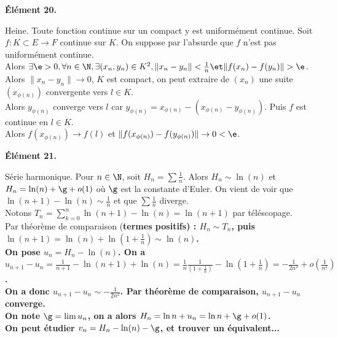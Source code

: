 \documentclass[11pt]{article}
\begin{document}
\begin{center}
    \bf{Élément 20.}
\end{center}

\begin{thm}{Heine.}{}
    Toute fonction continue sur un compact y est uniformément continue.
    \tcblower
    Soit $f:K\subset E\to F$ continue sur $K$. On suppose par l'absurde que $f$ n'est pas uniformément continue.\\
    Alors $\exists \e > 0, \forall n \in \N, \exists(x_n,y_n)\in K^2, \|x_n-y_n\|<\frac{1}{n} \et \|f(x_n)-f(y_n)\|>\e$.\\
    Alors $\|x_n-y_n\|\to0$, $K$ est compact, on peut extraire de $(x_n)$ une suite $(x_{\phi(n)})$ convergente vers $l\in K$.\\
    Alors $y_{\phi(n)}$ converge vers $l$ car $y_{\phi(n)}=x_{\phi(n)}-(x_{\phi(n)}-y_{\phi(n)})$. Puis $f$ est continue en $l\in K$.\\
    Alors $f(x_{\phi(n)})\to f(l)$ et $\|f(x_{\phi(n)}) - f(y_{\phi(n)})\| \to 0 < \e$.
\end{thm}

\begin{center}
    \bf{Élément 21.}
\end{center}

\begin{prop}{Série harmonique.}{}
    Pour $n\in\N$, soit $H_n=\sum \frac{1}{n}$. Alors $H_n\sim\ln(n)$ et $H_n=\ln(n)+\g+o(1)$ où $\g$ est la constante d'Euler.
    \tcblower
    On vient de voir que $\ln(n+1)-\ln(n)\sim\frac{1}{n}$ et que $\sum\frac{1}{n}$ diverge.\\
    Notons $T_n=\sum_{k=0}^n\ln(n+1)-\ln(n)=\ln(n+1)$ par téléscopage.\\
    Par théorème de comparaison (\bf{termes positifs}) : $H_n\sim T_n$, puis $\ln(n+1)=\ln(n)+\ln(1+\frac{1}{n})\sim \ln(n)$.\\
    On pose $u_n=H_n-\ln(n)$. On a $u_{n+1}-u_n = \frac{1}{n+1}-\ln(n+1)+\ln(n)=\frac{1}{n}\frac{1}{(1+\frac{1}{n})}-\ln(1+\frac{1}{n})=-\frac{1}{2n^2}+o(\frac{1}{n^2})$.\\
    On a donc $u_{n+1}-u_n\sim-\frac{1}{2n^2}$. Par théorème de comparaison, $u_{n+1}-u_n$ converge.\\
    On note $\g=\lim u_n$, on a alors $H_n=\ln n + u_n = \ln n + \g + o(1)$.\\
    On peut étudier $v_n = H_n - \ln(n) - \g$, et trouver un équivalent...
\end{prop}
\end{document}
